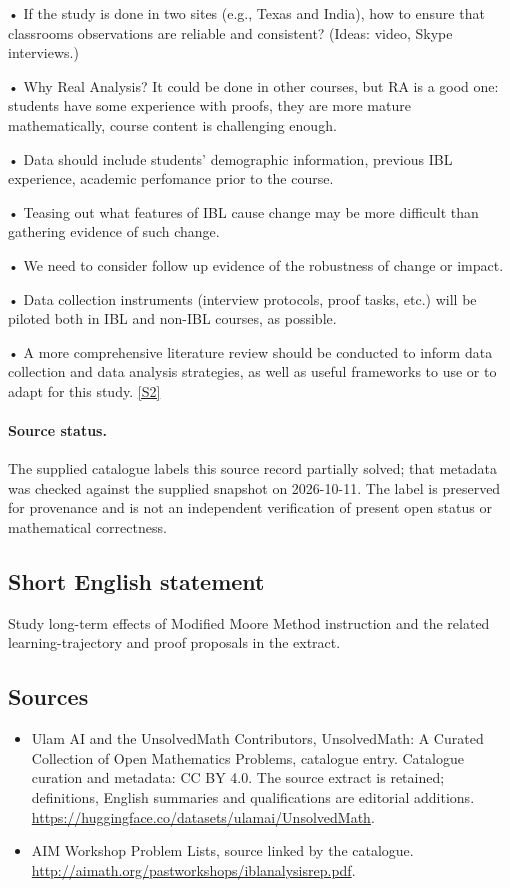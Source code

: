 \documentclass[11pt]{article}
\begin{document}
• If the study is done in two sites (e.g., Texas and India), how to ensure that classrooms observations are reliable and consistent? (Ideas: video, Skype interviews.)

• Why Real Analysis? It could be done in other courses, but RA is a good one: students have some experience with proofs, they are more mature mathematically, course content is challenging enough.

• Data should include students' demographic information, previous IBL experience, academic perfomance prior to the course.

• Teasing out what features of IBL cause change may be more difficult than gathering evidence of such change.

• We need to consider follow up evidence of the robustness of change or impact.

• Data collection instruments (interview protocols, proof tasks, etc.) will be piloted both in IBL and non-IBL courses, as possible.

• A more comprehensive literature review should be conducted to inform data collection and data analysis strategies, as well as useful frameworks to use or to adapt for this study. \href{http://aimath.org/pastworkshops/iblanalysisrep.pdf}{[S2]}
\paragraph{Source status.}
The supplied catalogue labels this source record partially solved; that metadata was checked against the supplied snapshot on 2026-10-11. The label is preserved for provenance and is not an independent verification of present open status or mathematical correctness.
\subsection{Short English statement}
Study long-term effects of Modified Moore Method instruction and the related learning-trajectory and proof proposals in the extract.
\subsection{Sources}
\begin{itemize}
\item[S1] Ulam AI and the UnsolvedMath Contributors, UnsolvedMath: A Curated Collection of Open Mathematics Problems, catalogue entry. Catalogue curation and metadata: CC BY 4.0. The source extract is retained; definitions, English summaries and qualifications are editorial additions.
\url{https://huggingface.co/datasets/ulamai/UnsolvedMath}.
\item[S2] AIM Workshop Problem Lists, source linked by the catalogue.
\url{http://aimath.org/pastworkshops/iblanalysisrep.pdf}.
\end{itemize}
\end{document}
